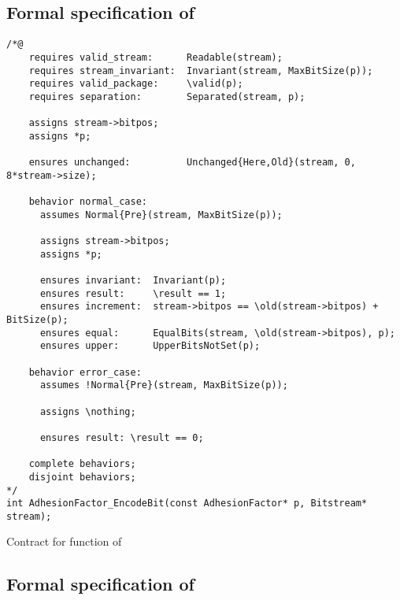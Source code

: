 \FloatBarrier

\subsection{Formal specification of }
\label{sec:adhesionfactor-decodebit}

\begin{listing}[hbt]
\begin{minipage}{0.99\textwidth}
\begin{lstlisting}[style=acsl-block]
/*@
    requires valid_stream:      Readable(stream);
    requires stream_invariant:  Invariant(stream, MaxBitSize(p));
    requires valid_package:     \valid(p);
    requires separation:        Separated(stream, p);

    assigns stream->bitpos;
    assigns *p;

    ensures unchanged:          Unchanged{Here,Old}(stream, 0, 8*stream->size);

    behavior normal_case:
      assumes Normal{Pre}(stream, MaxBitSize(p));

      assigns stream->bitpos;
      assigns *p;

      ensures invariant:  Invariant(p);
      ensures result:     \result == 1;
      ensures increment:  stream->bitpos == \old(stream->bitpos) + BitSize(p);
      ensures equal:      EqualBits(stream, \old(stream->bitpos), p);
      ensures upper:      UpperBitsNotSet(p);

    behavior error_case:
      assumes !Normal{Pre}(stream, MaxBitSize(p));

      assigns \nothing;

      ensures result: \result == 0;

    complete behaviors;
    disjoint behaviors;
*/
int AdhesionFactor_EncodeBit(const AdhesionFactor* p, Bitstream* stream);
\end{lstlisting}
\end{minipage}
\caption{\label{lst:adhesionfactor-decodebit}Contract for  function of \adhesion}
\end{listing}

\FloatBarrier

\subsection{Formal specification of }
\label{sec:adhesionfactor-encodebit}

